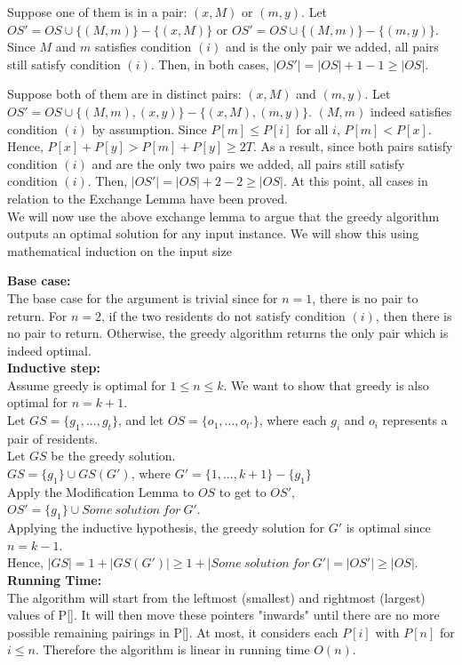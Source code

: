 \documentclass{exam}
\begin{document}
\begin{questions}
Suppose one of them is in a pair: $(x,M)$ or $(m,y)$. Let $OS'=OS\cup \{(M,m)\}-\{(x,M)\}$ or $OS'=OS\cup \{(M,m)\}-\{(m,y)\}$. Since $M$ and $m$ satisfies condition $(i)$ and is the only pair we added, all pairs still satisfy condition $(i)$. Then, in both cases, $|OS'|=|OS|+1-1\geq |OS|$. 

Suppose both of them are in distinct pairs: $(x,M)$ and $(m,y)$. Let $OS'=OS\cup \{(M,m),(x,y)\}-\{(x,M),(m,y)\}$. $(M,m)$ indeed satisfies condition $(i)$ by assumption. Since $P[m]\leq P[i]$ for all $i$, $P[m]<P[x]$. Hence,  $P[x]+P[y]>P[m]+P[y]\geq 2T$. As a result, since both pairs satisfy condition $(i)$ and are the only two pairs we added, all pairs still satisfy condition $(i)$. Then, $|OS'|=|OS|+2-2\geq |OS|$. At this point, all cases in relation to the Exchange Lemma have been proved. \\

We will now use the above exchange lemma to argue that the greedy algorithm outputs an optimal solution for any input instance. 
We will show this using mathematical induction on the input size

{\bf Base case:}\\
The base case for the argument is trivial since for $n=1$, there is no pair to return. For $n=2$, if the two residents do not satisfy condition $(i)$, then there is no pair to return. Otherwise, the greedy algorithm returns the only pair which is indeed optimal.\\

{\bf Inductive step:}\\
Assume greedy is optimal for $1\leq n\leq k$. We want to show that greedy is also optimal for $n=k+1$.\\
Let $GS = \{g_1, ..., g_t\}$, and let $OS = \{o_1, ..., o_{t'}\}$, where each $g_i$ and $o_i$ represents a pair of residents.\\
Let $GS$ be the greedy solution.\\
$GS=\{g_1\}\cup GS(G')$, where $G'=\{1, ..., k+1\}-\{g_1\}$\\
Apply the Modification Lemma to $OS$ to get to $OS'$,\\
$OS'=\{g_1\}\cup Some\:solution\:for\:G'$.\\
Applying the inductive hypothesis, the greedy solution for $G'$ is optimal since $n=k-1$. \\
Hence, $|GS|=1+|GS(G')|\geq 1+|Some\:solution\:for\:G'|=|OS'|\geq|OS|$.\\

{\bf Running Time:}\\
The algorithm will start from the leftmost (smallest) and rightmost (largest) values of P[]. It will then move these pointers "inwards" until there are no more possible remaining pairings in P[]. At most, it considers each $P[i]$ with $P[n]$ for $i \leq n$. Therefore the algorithm is linear in running time $O(n)$.\\


\end{questions}
\end{document}

